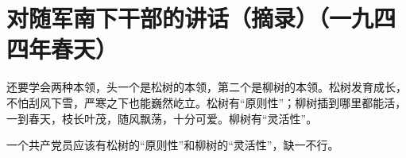 \section[对随军南下干部的讲话（摘录）（一九四四年春天）]{对随军南下干部的讲话（摘录）（一九四四年春天）}


还要学会两种本领，头一个是松树的本领，第二个是柳树的本领。松树发育成长，不怕刮风下雪，严寒之下也能巍然屹立。松树有“原则性”；柳树插到哪里都能活，一到春天，枝长叶茂，随风飘荡，十分可爱。柳树有“灵活性”。

一个共产党员应该有松树的“原则性”和柳树的“灵活性”，缺一不行。

